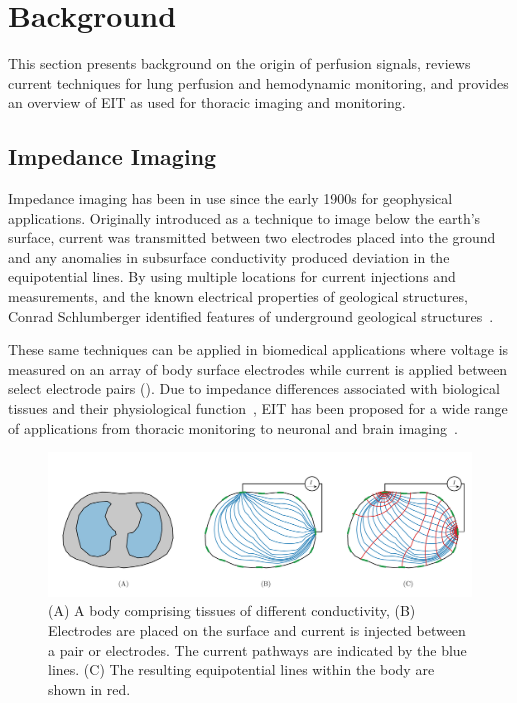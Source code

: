 \chapter{Background}
This section presents background on the 
origin of perfusion signals, reviews current techniques for lung perfusion and hemodynamic
monitoring, and provides an overview 
of EIT as used for thoracic imaging and monitoring.

\section{Impedance Imaging}
\label{sec:impedance_imaging}
Impedance imaging has been in use since the early 1900s for geophysical applications.  
Originally introduced as a technique to image below the earth’s surface, 
current was transmitted between two electrodes placed into the ground and any 
anomalies in subsurface conductivity produced deviation 
in the equipotential lines. 
By using multiple locations for current injections and measurements, 
and the known 
electrical properties of geological structures, Conrad Schlumberger identified
features of underground geological structures~\parencite{allaud_schlumberger_1977}.

These same techniques can be applied in biomedical applications where
voltage is measured on an array of body surface electrodes 
while current is applied between select electrode pairs (). 
Due to impedance differences associated with biological tissues and their physiological 
function~\parencite{geddes_specific_1967,mcadams_tissue_1995},
EIT has been proposed for a wide range of applications from thoracic monitoring
\parencite{frerichs_chest_2017} to neuronal and 
brain imaging~\parencite{holder_electrical_1992}.

\begin{figure}[H]
    \centering
   \includegraphics[width=\textwidth]{chapter2-background/imgs/current_and_equipotential_lines.pdf}
   \caption[Current and equipotential lines]{\label{fig:cur_equip_line} 
   (A) A body comprising tissues of different conductivity, (B) Electrodes are placed on the surface 
   and current is injected between a pair or electrodes. The current pathways are indicated 
   by the blue lines. (C) The resulting equipotential lines within the body are shown in red.}
\end{figure}

